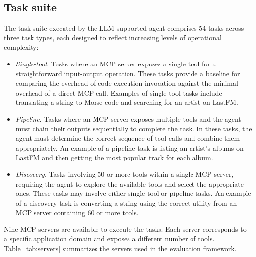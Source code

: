 \documentclass[runningheads]{llncs}
\begin{document}
\subsection{Task suite}
\label{sec:task_suite}


The task suite executed by the LLM‑supported agent comprises 54 tasks across three task types, each designed to reflect increasing levels of operational complexity:


\begin{itemize}

  \item \textit{Single-tool}. Tasks where an MCP server exposes a single tool for a straightforward input-output operation. These tasks provide a baseline for comparing the overhead of code‑execution invocation against the minimal overhead of a direct MCP call. Examples of single-tool tasks include translating a string to Morse code and searching for an artist on LastFM.
    
  \item \textit{Pipeline}. Tasks where an MCP server exposes multiple tools and the agent must chain their outputs sequentially to complete the task. In these tasks, the agent must determine the correct sequence of tool calls and combine them appropriately. An example of a pipeline task is listing an artist's albums on LastFM and then getting the most popular track for each album.
  
  \item \textit{Discovery}. Tasks involving 50 or more tools within a single MCP server, requiring the agent to explore the available tools and select the appropriate ones. These tasks may involve either single‑tool or pipeline tasks. An example of a discovery task is converting a string using the correct utility from an MCP server containing 60 or more tools.
    
\end{itemize}

Nine MCP servers are available to execute the tasks. Each server corresponds to a specific application domain and exposes a different number of tools. Table~\ref{tab:servers} summarizes the servers used in the evaluation framework.
\end{document}
